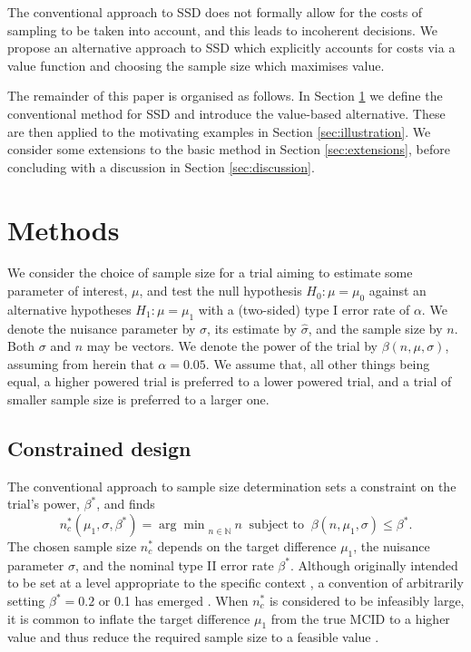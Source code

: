 \documentclass[sagev, Crown]{sagej}
\begin{document}
The conventional approach to SSD does not formally allow for the costs of sampling to be taken into account, and this leads to incoherent decisions. We propose an alternative approach to SSD which explicitly accounts for costs via a value function and choosing the sample size which maximises value. 

The remainder of this paper is organised as follows. In Section \ref{sec:methods} we define the conventional method for SSD and introduce the value-based alternative. These are then applied to the motivating examples in Section \ref{sec:illustration}. We consider some extensions to the basic method in Section \ref{sec:extensions}, before concluding with a discussion in Section \ref{sec:discussion}.

\section{Methods}\label{sec:methods}

We consider the choice of sample size for a trial aiming to estimate some parameter of interest, $\mu$, and test the null hypothesis $H_0: \mu = \mu_0$ against an alternative hypotheses $H_1: \mu = \mu_1$ with a (two-sided) type I error rate of $\alpha$. We denote the nuisance parameter by $\sigma$, its estimate by $\hat{\sigma}$, and the sample size by $n$. Both $\sigma$ and $n$ may be vectors. We denote the power of the trial by $\beta(n, \mu, \sigma)$, assuming from herein that $\alpha = 0.05$. We assume that, all other things being equal, a higher powered trial is preferred to a lower powered trial, and a trial of smaller sample size is preferred to a larger one. 

\subsection{Constrained design}

The conventional approach to sample size determination sets a constraint on the trial's power, $\beta^*$, and finds
\begin{equation}
n^*_c (\mu_1, \sigma, \beta^*) = {\arg\min}_{n \in \mathbb{N}}~ n ~\text{ subject to } ~ \beta(n, \mu_1, \sigma) \leq \beta^*.
\end{equation}
The chosen sample size $n^*_c$ depends on the target difference $\mu_1$, the nuisance parameter $\sigma$, and the nominal type II error rate $\beta^*$. Although originally intended to be set at a level appropriate to the specific context \cite{Neyman1933}, a convention of arbitrarily setting $\beta^* = 0.2$ or 0.1 has emerged \cite{Bacchetti2019}. When $n^*_c$ is considered to be infeasibly large, it is common to inflate the target difference $\mu_1$ from the true MCID to a higher value and thus reduce the required sample size to a feasible value \cite{Schulz2005}.
\end{document}
